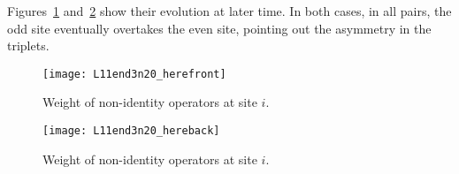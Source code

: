 \documentclass[11pt]{article}
\begin{document}
Figures~\ref{fig:L11end3n20_herefront} and~\ref{fig:L11end3n20_hereback} show their evolution at later time. In both cases, in all pairs, the odd site eventually overtakes the even site, pointing out the asymmetry in the triplets.
\begin{figure}
	\centering
	\texttt{[image: L11end3n20\_herefront]}
	\caption{Weight of non-identity operators at site $i$.}
	\label{fig:L11end3n20_herefront}
\end{figure}
\begin{figure}
	\centering
	\texttt{[image: L11end3n20\_hereback]}
	\caption{Weight of non-identity operators at site $i$.}
	\label{fig:L11end3n20_hereback}
\end{figure}
\end{document}
